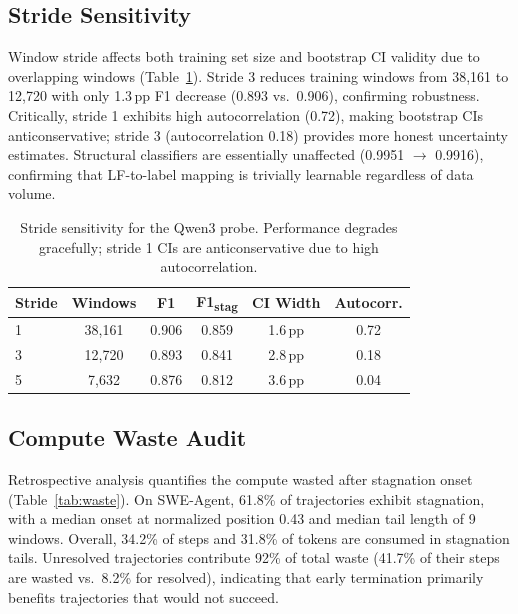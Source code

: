 \documentclass[11pt,a4paper]{article}
\begin{document}
\subsection{Stride Sensitivity}

Window stride affects both training set size and bootstrap CI validity due to overlapping windows (Table~\ref{tab:stride}).
Stride 3 reduces training windows from 38,161 to 12,720 with only 1.3\,pp F1 decrease (0.893 vs.\ 0.906), confirming robustness.
Critically, stride 1 exhibits high autocorrelation (0.72), making bootstrap CIs anticonservative; stride 3 (autocorrelation 0.18) provides more honest uncertainty estimates.
Structural classifiers are essentially unaffected (0.9951 $\to$ 0.9916), confirming that LF-to-label mapping is trivially learnable regardless of data volume.

\begin{table}[t]
\centering
\small
\begin{tabular}{lccccc}
\toprule
\textbf{Stride} & \textbf{Windows} & \textbf{F1} & \textbf{F1\textsubscript{stag}} & \textbf{CI Width} & \textbf{Autocorr.} \\
\midrule
1 & 38,161 & 0.906 & 0.859 & 1.6\,pp & 0.72 \\
3 & 12,720 & 0.893 & 0.841 & 2.8\,pp & 0.18 \\
5 & 7,632 & 0.876 & 0.812 & 3.6\,pp & 0.04 \\
\bottomrule
\end{tabular}
\caption{Stride sensitivity for the Qwen3 probe. Performance degrades gracefully; stride 1 CIs are anticonservative due to high autocorrelation.}
\label{tab:stride}
\end{table}

\subsection{Compute Waste Audit}

Retrospective analysis quantifies the compute wasted after stagnation onset (Table~\ref{tab:waste}).
On SWE-Agent, 61.8\% of trajectories exhibit stagnation, with a median onset at normalized position 0.43 and median tail length of 9 windows.
Overall, 34.2\% of steps and 31.8\% of tokens are consumed in stagnation tails.
Unresolved trajectories contribute 92\% of total waste (41.7\% of their steps are wasted vs.\ 8.2\% for resolved), indicating that early termination primarily benefits trajectories that would not succeed.
\end{document}
